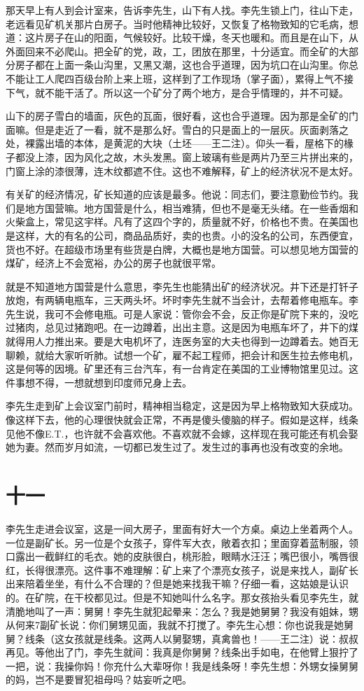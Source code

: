那天早上有人到会计室来，告诉李先生，山下有人找。李先生锁上门，往山下走，老远看见矿机关那片白房子。当时他精神比较好，又恢复了格物致知的它毛病，想道：这片房子在山的阳面，气候较好。比较干燥，冬天也暖和。而且是在山下，从外面回来不必爬山。把全矿的党，政，工，团放在那里，十分适宜。而全矿的大部分房子都在上面一条山沟里，又黑又潮，这也合乎道理，因为坑口在山沟里。你总不能让工人爬四百级台阶上来上班，这样到了工作现场（掌子面），累得上气不接下气，就不能干活了。所以这一个矿分了两个地方，是合乎情理的，并不可疑。 

山下的房子雪白的墙面，灰色的瓦面，很好看，这也合乎道理。因为那是全矿的门面嘛。但是走近了一看，就不是那么好。雪白的只是面上的一层灰。灰面剥落之处，裸露出墙的本体，是黄泥的大块（土坯——王二注）。仰头一看，屋格下的椽子都没上漆，因为风化之故，木头发黑。窗上玻璃有些是两片乃至三片拼出来的，门窗上涂的漆很薄，连木纹都遮不住。这也不难解释，矿上的经济状况不是太好。 

有关矿的经济情况，矿长知道的应该是最多。他说：同志们，要注意勤俭节约。我们是地方国营嘛。地方国营是什么，相当难猜，但也不是毫无头绪。在一些香烟和火柴盒上，常见这宇样。凡有了这四个字的，质量就不好，价格也不贵。在美国也是这样，大的有名的公司，商品品质好，卖的也贵。小的没名的公司，东西便宜，货也不好。在超级市场里有些货是白牌，大概也是地方国营。可以想见地方国营的煤矿，经济上不会宽裕，办公的房子也就很平常。 

就是不知道地方国营是什么意思，李先生也能猜出矿的经济状况。井下还是打钎子放炮，有两辆电瓶车，三天两头坏。坏时李先生就不当会计，去帮着修电瓶车。李先生说，我可不会修电瓶。可是人家说：管你会不会，反正你是矿院下来的，没吃过猪肉，总见过猪跑吧。在一边蹲着，出出主意。这是因为电瓶车坏了，井下的煤就得用人力推出来。要是大电机坏了，连医务室的大夫也得到一边蹲着去。她百无聊赖，就给大家听听肺。试想一个矿，雇不起工程师，把会计和医生拉去修电机，这是何等的因境。矿里还有三台汽车，有一台肯定在美国的工业博物馆里见过。这件事想不得，一想就想到印度师兄身上去。 

李先生走到矿上会议室门前时，精神相当稳定，这是因为早上格物致知大获成功。像这样下去，他的心理很快就会正常，不再是傻头傻脑的样子。假如是这样，线条见他不像E.T.，也许就不会喜欢他。不喜欢就不会嫁，这样现在我可能还有机会娶她为妻。然而岁月如流，一切都已发生过了。发生过的事再也没有改变的余地。

\section{十一}

李先生走进会议室，这是一间大房子，里面有好大一个方桌。桌边上坐着两个人。一位是副矿长。另一位是个女孩子，穿件军大衣，敞着衣扣；里面穿着蓝制服，领口露出一截鲜红的毛衣。她的皮肤很白，桃形脸，眼睛水汪汪；嘴巴很小，嘴唇很红，长得很漂亮。这件事不难理解：矿上来了个漂亮女孩子，说是来找人，副矿长出来陪着坐坐，有什么不合理的？但是她来找我干嘛？仔细一看，这姑娘是认识的。在矿院，在干校都见过。但是不知她叫什么名字。那女孩抬头看见李先生，就清脆地叫了一声：舅舅！李先生就犯起晕来：怎么？我是她舅舅？我没有姐妹，甥从何来7副矿长说：你们舅甥见面，我就不打搅了。李先生心想：你也说我是她舅舅？线条（这女孩就是线条。这两人以舅娶甥，真禽兽也！——王二注）说：叔叔再见。等他出了门，李先生就间：我真是你舅舅？线条出手如电，在他臂上狠拧了一把，说：我操你妈！你充什么大辈呀你！我是线条呀！李先生想：外甥女操舅舅的妈，岂不是要冒犯祖母吗？姑妄听之吧。 


